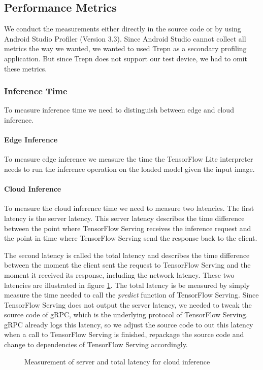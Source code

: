 \subsection{Performance Metrics}
\label{chap:insta_measurements}
We conduct the measurements either directly in the source code or by using Android Studio Profiler (Version 3.3). Since Android Studio cannot collect all metrics the way we wanted, we wanted to used Trepn as a secondary profiling application. But since Trepn does not support our test device, we had to omit these metrics.
\subsubsection{Inference Time}
To measure inference time we need to  distinguish between edge and cloud inference.
\paragraph{Edge Inference}To measure edge inference we measure the time the TensorFlow Lite interpreter needs to run the inference operation on the loaded model given the input image.
\paragraph{Cloud Inference}
To measure the cloud inference time we need to measure two latencies. The first latency is the server latency. This server latency describes the time difference between the point where TensorFlow Serving receives the inference request and the point in time where TensorFlow Serving send the response back to the client.



The second latency is called the total latency and describes the time difference between the moment the client sent the request to TensorFlow Serving and the moment it received its response, including the network latency.
These two latencies are illustrated in figure \ref{fig:serverLat}.
The total latency is be measured by simply measure the time needed to call the \emph{predict} function of TensorFlow Serving.
Since TensorFlow Serving does not output the server latency, we needed to tweak the source code of gRPC, which is the underlying protocol of TensorFlow Serving. gRPC already logs this latency, so we adjust the source code to out this latency when a call to TensorFlow Serving is finished, repackage the source code and change to dependencies of TensorFlow Serving accordingly.
\begin{figure}[H]
\centering

\caption{Measurement of server and total latency for cloud inference}
\label{fig:serverLat}
\end{figure}
